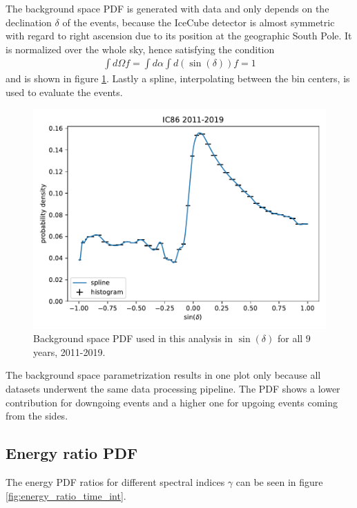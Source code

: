 The background space PDF is generated with data and only depends on the declination $\delta$ of the events, because the IceCube detector is almost symmetric with regard to right ascension due to its position at the geographic South Pole.
It is normalized over the whole sky, hence satisfying the condition
\begin{align}
  \int d\Omega f = \int d\alpha \int d(\sin(\delta)) f = 1
\end{align}
and is shown in figure \ref{fig:bg_param_time_int}.
Lastly a spline, interpolating between the bin centers, is used to evaluate the events.
\begin{figure}
    \centering
    \includegraphics[width=\linewidth]{Plots/05_csky/bg_space_pdf.pdf}
    \caption{Background space PDF used in this analysis in $\sin{(\delta)}$ for all $\num{9}$ years, 2011-2019.}
    \label{fig:bg_param_time_int}
\end{figure}
The background space parametrization results in one plot only because all datasets underwent the same data processing pipeline.
The PDF shows a lower contribution for downgoing events and a higher one for upgoing events coming from the sides.

\subsection{Energy ratio PDF}

The energy PDF ratios for different spectral indices $\gamma$ can be seen in figure \ref{fig:energy_ratio_time_int}.

